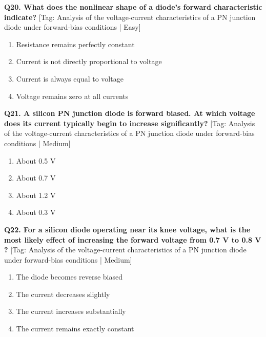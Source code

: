\noindent\textbf{Q20. What does the nonlinear shape of a diode's forward characteristic indicate?} \hfill [Tag: Analysis of the voltage-current characteristics of a PN junction diode under forward-bias conditions | Easy]
\begin{enumerate}[label=(\alph*),topsep=2pt,itemsep=1pt,partopsep=0pt,parsep=0pt]
    \item {Resistance remains perfectly constant}
    \item {Current is not directly proportional to voltage}
    \item {Current is always equal to voltage}
    \item {Voltage remains zero at all currents}
\end{enumerate}
\vspace{2mm}

\noindent\textbf{Q21. A silicon PN junction diode is forward biased. At which voltage does its current typically begin to increase significantly?} \hfill [Tag: Analysis of the voltage-current characteristics of a PN junction diode under forward-bias conditions | Medium]
\begin{enumerate}[label=(\alph*),topsep=2pt,itemsep=1pt,partopsep=0pt,parsep=0pt]
    \item {About 0.5 V}
    \item {About 0.7 V}
    \item {About 1.2 V}
    \item {About 0.3 V}
\end{enumerate}
\vspace{2mm}

\noindent\textbf{Q22. For a silicon diode operating near its knee voltage, what is the most likely effect of increasing the forward voltage from 0.7 V to 0.8 V ?} \hfill [Tag: Analysis of the voltage-current characteristics of a PN junction diode under forward-bias conditions | Medium]
\begin{enumerate}[label=(\alph*),topsep=2pt,itemsep=1pt,partopsep=0pt,parsep=0pt]
    \item {The diode becomes reverse biased}
    \item {The current decreases slightly}
    \item {The current increases substantially}
    \item {The current remains exactly constant}
\end{enumerate}
\vspace{2mm}


